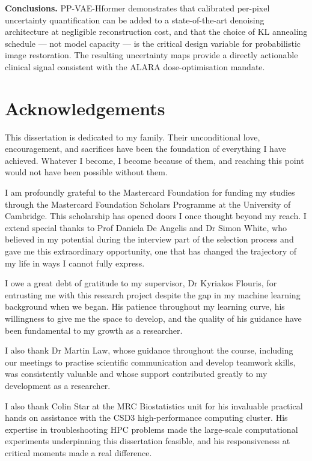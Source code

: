 \documentclass[12pt, a4paper, twoside, openright]{book}
\begin{document}
\textbf{Conclusions.}
PP-VAE-Hformer demonstrates that calibrated per-pixel uncertainty quantification can be added to a state-of-the-art denoising architecture at negligible reconstruction cost, and that the choice of KL annealing schedule — not model capacity — is the critical design variable for probabilistic image restoration. The resulting uncertainty maps provide a directly actionable clinical signal consistent with the ALARA dose-optimisation mandate.

\newpage

\chapter*{Acknowledgements}

This dissertation is dedicated to my family. Their unconditional love, encouragement, and sacrifices have been the foundation of everything I have achieved. Whatever I become, I become because of them, and reaching this point would not have been possible without them.

I am profoundly grateful to the Mastercard Foundation for funding my studies through the Mastercard Foundation Scholars Programme at the University of Cambridge. This scholarship has opened doors I once thought beyond my reach. I extend special thanks to Prof Daniela De Angelis and  Dr Simon White, who believed in my potential during the interview part of the selection process and gave me this extraordinary opportunity, one that has changed the trajectory of my life in ways I cannot fully express.

I owe a great debt of gratitude to my supervisor, Dr Kyriakos Flouris, for entrusting me with this research project despite the gap in my machine learning background when we began. His patience throughout my learning curve, his willingness to give me the space to develop, and the quality of his guidance have been fundamental to my growth as a researcher.

I also thank Dr Martin Law, whose guidance throughout the course, including our meetings to practise scientific communication and develop teamwork skills, was consistently valuable and whose support contributed greatly to my development as a researcher.

I also thank Colin Star at the MRC Biostatistics unit for his invaluable practical hands on assistance with the CSD3 high-performance computing cluster. His expertise in troubleshooting HPC problems made the large-scale computational experiments underpinning this dissertation feasible, and his responsiveness at critical moments made a real difference.
\end{document}
